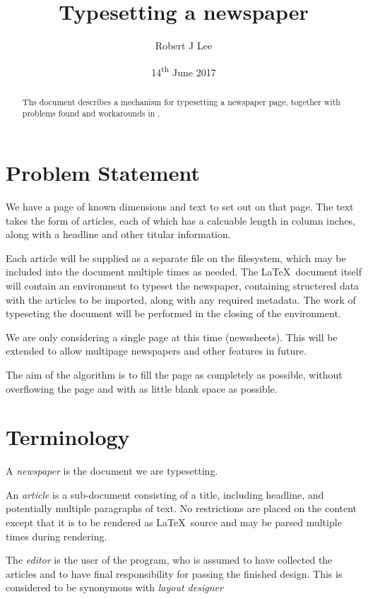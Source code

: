 \documentclass[a4paper]{scrartcl}
\begin{document}
\title{Typesetting a newspaper}
\author{Robert J Lee}
\date{14\textsuperscript{th} June 2017}

\maketitle

\begin{abstract} Ths document describes a mechanism for typesetting a
	newspaper page, together with problems found and workarounds in
	\LaTeXe.
\end{abstract}

\section{Problem Statement}

We have a page of known dimensions and text to set out on that page.
The text takes the form of articles, each of which has a calcuable
length in column inches, along with a headline and other titular
information.

Each article will be supplied as a separate file on the filesystem,
which may be included into the document multiple times as needed. The
\LaTeX\ document itself will contain an environment to typeset the
newspaper, containing structered data with the articles to be
imported, along with any required metadata. The work of typeseting the
document will be performed in the closing of the environment.

We are only considering a single page at this time (newssheets). This
will be extended to allow multipage newspapers and other features in future.

The aim of the algorithm is to fill the page as completely as
possible, without overflowing the page and with as little blank space
as possible.

\section{Terminology}

A \textit{newspaper} is the document we are typesetting.

An \textit{article} is a sub-document consisting of a title, including
headline, and potentially multiple paragraphs of text. No restrictions
are placed on the content except that it is to be rendered as
\LaTeX\ source and may be parsed multiple times during rendering.

The \textit{editor} is the user of the program, who is assumed to have
collected the articles and to have final responsibility for passing
the finished design. This is considered to be synonymous with
\textit{layout designer}
\end{document}
